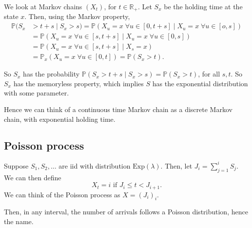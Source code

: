 \documentclass[12pt]{article}
\begin{document}
We look at Markov chains $(X_t)$, for $t \in \mathbb{R}_{+}$. Let $S_x$ be the holding time at the state $x$. Then, using the Markov property,
\begin{align*}
	\mathbb{P}(S_x &> t + s \mid S_x > s) = \mathbb{P}(X_u = x \;\forall u \in [0, t+s] \mid X_u = x \; \forall u \in [o, s]) \\
		       &= \mathbb{P}(X_u = x \; \forall u \in [s, t+s] \mid X_u = x \; \forall u \in [0, s]) \\
		       &=\mathbb{P}(X_u = x \; \forall u \in [s, t+s] \mid X_s = x) \\
		       &= \mathbb{P}_x(X_u = x \; \forall u \in [0, t]) = \mathbb{P}(S_x > t).
\end{align*}

So $S_x$ has the probability $\mathbb{P}(S_x > t + s \mid S_x > s) = \mathbb{P}(S_x > t)$, for all $s, t$. So $S_x$ has the memoryless property, which implies $S$ has the exponential distribution with some parameter.

Hence we can think of a continuous time Markov chain as a discrete Markov chain, with exponential holding time.

\subsection{Poisson process}%
\label{sub:poisson_process}

Suppose $S_1, S_2, \ldots$ are iid with distribution $\mathrm{Exp}(\lambda)$. Then, let $J_i = \sum_{j = 1}^{i} S_j$. We can then define
\[
	X_t = i \text{ if } J_i \leq t < J_{i+1}
.\]
We can think of the Poisson process as $X = (J_i)_{i}$.

Then, in any interval, the number of arrivals follows a Poisson distribution, hence the name.

\newpage

\printindex
\end{document}
